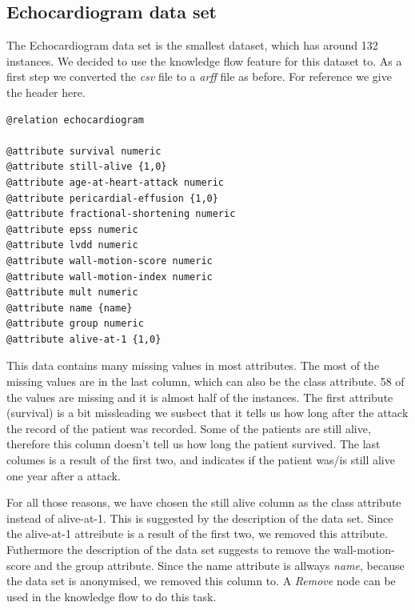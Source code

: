 \documentclass[a4paper]{article}
\begin{document}
\subsection{Echocardiogram data set}
The Echocardiogram data set is the smallest dataset, which has around 132
instances. We decided to use the knowledge flow feature for this dataset to.
As a first step we converted the \emph{csv} file to a \emph{arff} file as
before. For reference we give the header here.
\begin{verbatim}
@relation echocardiogram

@attribute survival numeric
@attribute still-alive {1,0}
@attribute age-at-heart-attack numeric
@attribute pericardial-effusion {1,0}
@attribute fractional-shortening numeric
@attribute epss numeric
@attribute lvdd numeric
@attribute wall-motion-score numeric
@attribute wall-motion-index numeric
@attribute mult numeric
@attribute name {name}
@attribute group numeric
@attribute alive-at-1 {1,0}
\end{verbatim}

This data contains many missing values in most attributes.
The most of the missing values are in the last column, which can
also be the class attribute. 58 of the values are missing and it is almost
half of the instances. The first attribute (survival) is a bit missleading
we susbect that it tells us how long after the
attack the record of the patient was recorded. Some of the patients are still
alive, therefore this column doesn't tell us how long the patient survived. 
The last columes is a result of the first two, and
indicates if the patient was/is still alive one year after a attack. 

For all those  reasons, we have chosen the still alive column as
the class attribute instead of alive-at-1. This is suggested by the description
of the data set. Since the alive-at-1 attreibute is a result of the first two,
we removed this attribute. Futhermore the description of the data set suggests
to remove the wall-motion-score and the group attribute. Since the name
attribute is allways \emph{name}, because the data set is anonymised, we removed
this column to. A \emph{Remove} node can be used in the knowledge flow to do
this task. 
\end{document}
